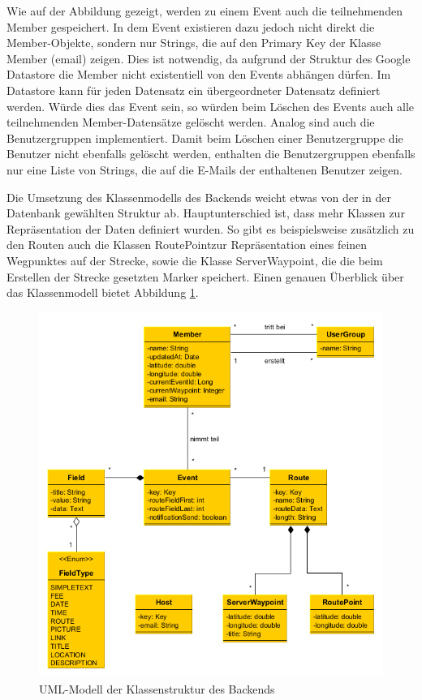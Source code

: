 Wie auf der Abbildung gezeigt, werden zu einem Event auch die teilnehmenden Member gespeichert. In dem Event existieren dazu jedoch nicht direkt die Member-Objekte, sondern nur Strings, die auf den Primary Key der Klasse Member (\glqq email\grqq) zeigen. Dies ist notwendig, da aufgrund der Struktur des Google Datastore die Member nicht existentiell von den Events abhängen dürfen. Im Datastore kann für jeden Datensatz ein übergeordneter Datensatz definiert werden. Würde dies das Event sein, so würden beim Löschen des Events auch alle teilnehmenden Member-Datensätze gelöscht werden. Analog sind auch die Benutzergruppen implementiert. Damit beim Löschen einer Benutzergruppe die Benutzer nicht ebenfalls gelöscht werden, enthalten die Benutzergruppen ebenfalls nur eine Liste von Strings, die auf die E-Mails der enthaltenen Benutzer zeigen.

Die Umsetzung des Klassenmodells des Backends weicht etwas von der in der Datenbank gewählten Struktur ab. Hauptunterschied ist, dass mehr Klassen zur Repräsentation der Daten definiert wurden. So gibt es beispielsweise zusätzlich zu den Routen auch die Klassen \glqq RoutePoint\grqq zur Repräsentation eines feinen Wegpunktes auf der Strecke, sowie die Klasse \glqq ServerWaypoint\grqq, die die beim Erstellen der Strecke gesetzten Marker speichert. Einen genauen Überblick über das Klassenmodell bietet Abbildung \ref{fig:backend_uml}.

\begin{figure}[htb]
\includegraphics[width=\textwidth]{graphics/backend_uml.png}
\caption{UML-Modell der Klassenstruktur des Backends}
\label{fig:backend_uml}
\end{figure}

